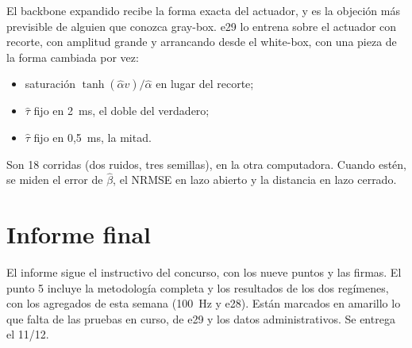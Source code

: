 \documentclass[11pt,a4paper]{article}
\newcommand{\bh}{\hat\beta}
\begin{document}
El backbone expandido recibe la forma exacta del actuador, y es la objeción más previsible de alguien que conozca gray-box. e29 lo entrena sobre el actuador con recorte, con amplitud grande y arrancando desde el white-box, con una pieza de la forma cambiada por vez:
\begin{itemize}[leftmargin=*,itemsep=0.15em]
\item saturación $\tanh(\hat\alpha v)/\hat\alpha$ en lugar del recorte;
\item $\hat\tau$ fijo en 2~ms, el doble del verdadero;
\item $\hat\tau$ fijo en 0,5~ms, la mitad.
\end{itemize}
Son 18 corridas (dos ruidos, tres semillas), en la otra computadora. Cuando estén, se miden el error de $\bh$, el NRMSE en lazo abierto y la distancia en lazo cerrado.

\section{Informe final}

El informe sigue el instructivo del concurso, con los nueve puntos y las firmas. El punto 5 incluye la metodología completa y los resultados de los dos regímenes, con los agregados de esta semana (100~Hz y e28). Están marcados en amarillo lo que falta de las pruebas en curso, de e29 y los datos administrativos. Se entrega el 11/12.
\end{document}
